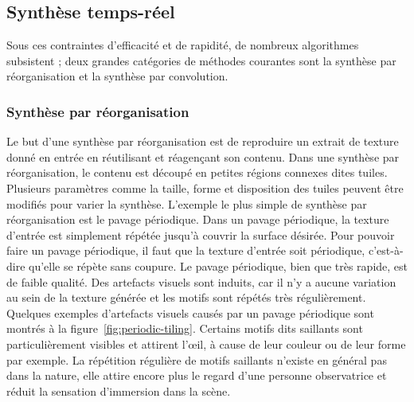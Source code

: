 \subsection{Synthèse temps-réel} %

Sous ces contraintes d'efficacité et de rapidité, de nombreux algorithmes subsistent ; deux grandes catégories de méthodes courantes sont la synthèse par réorganisation et la synthèse par convolution.

\subsubsection{Synthèse par réorganisation}

Le but d'une synthèse par réorganisation est de reproduire un extrait de texture donné en entrée en réutilisant et réagençant son contenu. Dans une synthèse par réorganisation, le contenu est découpé en petites régions connexes dites tuiles. Plusieurs paramètres comme la taille, forme et disposition des tuiles peuvent être modifiés pour varier la synthèse. L'exemple le plus simple de synthèse par réorganisation est le pavage périodique. Dans un pavage périodique, la texture d'entrée est simplement répétée jusqu'à couvrir la surface désirée. Pour pouvoir faire un pavage périodique, il faut que la texture d'entrée soit périodique, c'est-à-dire qu'elle se répète sans coupure. Le pavage périodique, bien que très rapide, est de faible qualité. Des artefacts visuels sont induits, car il n'y a aucune variation au sein de la texture générée et les motifs sont répétés très régulièrement. Quelques exemples d'artefacts visuels causés par un pavage périodique sont montrés à la figure~\ref{fig:periodic-tiling}. Certains motifs dits saillants sont particulièrement visibles et attirent l'œil, à cause de leur couleur ou de leur forme par exemple. La répétition régulière de motifs saillants n'existe en général pas dans la nature, elle attire encore plus le regard d'une personne observatrice et réduit la sensation d'immersion dans la scène.

\bigskip

